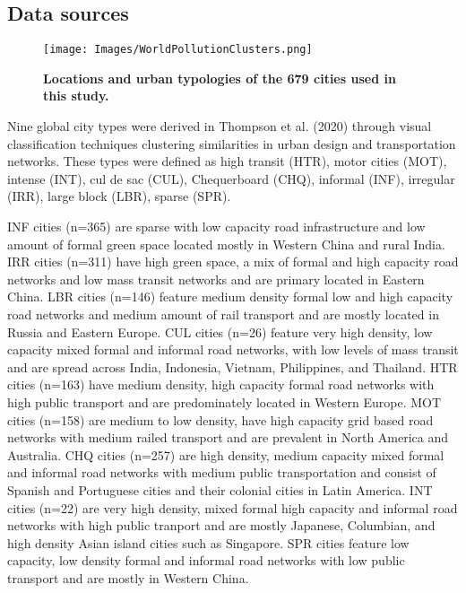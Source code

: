 \documentclass[preprint,12pt]{elsarticle}
\begin{document}
\subsection{Data sources}


\begin{figure}
\centering
\texttt{[image: Images/WorldPollutionClusters.png]}
\caption{\bf Locations and urban typologies of the 679 cities used in this study.}
 \label{fig:clusters}
\end{figure}

Nine global city types were derived in Thompson et al. (2020) \cite{Thompson2020} through visual classification techniques clustering similarities in urban design and transportation networks. These types were defined as high transit (HTR), motor cities (MOT), intense (INT), cul de sac (CUL), Chequerboard (CHQ), informal (INF), irregular (IRR), large block (LBR), sparse (SPR). 

INF cities (n=365) are sparse with low capacity road infrastructure and low amount of formal green space located mostly in Western China and rural India. IRR cities (n=311) have high green space, a mix of formal and high capacity road networks and low mass transit networks and are primary located in Eastern China. LBR cities (n=146) feature medium density formal low and high capacity road networks and medium amount of rail transport and are mostly located in Russia and Eastern Europe. CUL cities (n=26) feature very high density, low capacity mixed formal and informal road networks, with low levels of mass transit and are spread across India, Indonesia, Vietnam, Philippines, and Thailand. HTR cities (n=163) have medium density, high capacity formal road networks with high public transport and are predominately located in Western Europe. MOT cities (n=158) are medium to low density, have high capacity grid based road networks with medium railed transport and are prevalent in North America and Australia. CHQ cities (n=257) are high density, medium capacity mixed formal and informal road networks with medium public transportation and consist of Spanish and Portuguese cities and their colonial cities in Latin America. INT cities (n=22) are very high density, mixed formal high capacity and informal road networks with high public tranport and are mostly Japanese, Columbian, and high density Asian island cities such as Singapore. SPR cities feature low capacity, low density formal and informal road networks with low public transport and are mostly in Western China.
\end{document}
